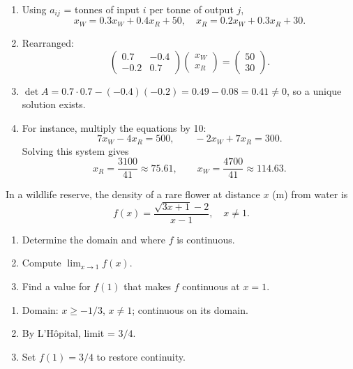 \documentclass[11pt]{exam}
\begin{document}
\begin{questions}
\begin{solution}
\begin{enumerate}[label=(\alph*)]
  \item Using \(a_{ij}\) = tonnes of input \(i\) per tonne of output \(j\),
  \[
    x_W = 0.3x_W + 0.4x_R + 50,\quad
    x_R = 0.2x_W + 0.3x_R + 30.
  \]
  \item Rearranged:
  \[
    \begin{pmatrix}
      0.7 & -0.4\\
     -0.2 & 0.7
    \end{pmatrix}
    \begin{pmatrix}x_W\\x_R\end{pmatrix}
    =
    \begin{pmatrix}50\\30\end{pmatrix}.
  \]
  \item \(\displaystyle \det A = 0.7\cdot0.7 - (-0.4)(-0.2) = 0.49-0.08 = 0.41\neq 0\), so a unique solution exists.
  \item For instance, multiply the equations by 10:
  \[
    7x_W - 4x_R = 500,\qquad -2x_W + 7x_R = 300.
  \]
  Solving this system gives
  \[
    x_R = \frac{3100}{41} \approx 75.61,\qquad
    x_W = \frac{4700}{41} \approx 114.63.
  \]
\end{enumerate}
\end{solution}

\question[2]
In a wildlife reserve, the density of a rare flower at distance \(x\) (m) from water is
\[
f(x)=\frac{\sqrt{3x+1}-2}{x-1},\quad x\neq1.
\]
\begin{enumerate}[leftmargin=0.5cm,label=(\alph*),rightmargin=0.2cm]
  \item Determine the domain and where \(f\) is continuous.
  \item Compute \(\displaystyle\lim_{x\to1}f(x)\).
  \item Find a value for \(f(1)\) that makes \(f\) continuous at \(x=1\).
\end{enumerate}

\begin{solution}
\begin{enumerate}[label=(\alph*)]
  \item Domain: \(x\ge-1/3\), \(x\neq1\); continuous on its domain.
  \item By L’Hôpital, limit = \(3/4\).
  \item Set \(f(1)=3/4\) to restore continuity.
\end{enumerate}
\end{solution}


\end{questions}
\end{document}
